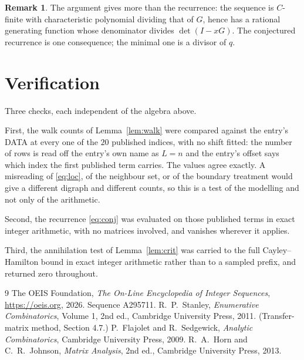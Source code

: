 \documentclass[11pt,a4paper]{article}
\theoremstyle{plain}
\theoremstyle{definition}
\newtheorem{remark}[theorem]{Remark}
\begin{document}
\begin{remark}
The argument gives more than the recurrence: the sequence is $C$-finite with characteristic
polynomial dividing that of $G$, hence has a rational generating function whose denominator
divides $\det(I-xG)$. The conjectured recurrence is one consequence; the minimal one is a
divisor of $q$.
\end{remark}

\section{Verification}

Three checks, each independent of the algebra above.

First, the walk counts of Lemma~\ref{lem:walk} were compared against the entry's DATA at
every one of the $20$ published indices, with no shift fitted: the number of rows is
read off the entry's own name as $L=n$ and the entry's offset says which index the first
published term carries. The values agree exactly. A misreading of \eqref{eq:loc}, of the
neighbour set, or of the boundary treatment would give a different digraph and different
counts, so this is a test of the modelling and not only of the arithmetic.

Second, the recurrence \eqref{eq:conj} was evaluated on those published terms in exact
integer arithmetic, with no matrices involved, and vanishes wherever it applies.

Third, the annihilation test of Lemma~\ref{lem:crit} was carried to the full
Cayley--Hamilton bound in exact integer arithmetic rather than to a sampled prefix, and
returned zero throughout.

\begin{thebibliography}{9}
 The OEIS Foundation, \emph{The On-Line Encyclopedia of Integer
Sequences}, \url{https://oeis.org}, 2026. Sequence A295711.
 R.~P.~Stanley, \emph{Enumerative Combinatorics}, Volume 1, 2nd ed.,
Cambridge University Press, 2011. (Transfer-matrix method, Section 4.7.)
 P.~Flajolet and R.~Sedgewick, \emph{Analytic Combinatorics}, Cambridge
University Press, 2009.
 R.~A.~Horn and C.~R.~Johnson, \emph{Matrix Analysis}, 2nd ed., Cambridge
University Press, 2013.
\end{thebibliography}
\end{document}
